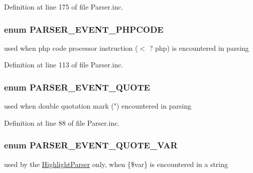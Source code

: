 \-Definition at line 175 of file \-Parser.\-inc.

\hypertarget{_parser_8inc_a120661dfb04934ff4fb7e78e822555c1}{
\subsubsection[{\-P\-A\-R\-S\-E\-R\-\_\-\-E\-V\-E\-N\-T\-\_\-\-P\-H\-P\-C\-O\-D\-E}]{\setlength{\rightskip}{0pt plus 5cm}enum {\bf \-P\-A\-R\-S\-E\-R\-\_\-\-E\-V\-E\-N\-T\-\_\-\-P\-H\-P\-C\-O\-D\-E}}}\label{_parser_8inc_a120661dfb04934ff4fb7e78e822555c1}
used when php code processor instruction ($<$ ? php) is encountered in parsing 

\-Definition at line 113 of file \-Parser.\-inc.

\hypertarget{_parser_8inc_a2b8139c345c6936b01a5fc73804520f3}{
\subsubsection[{\-P\-A\-R\-S\-E\-R\-\_\-\-E\-V\-E\-N\-T\-\_\-\-Q\-U\-O\-T\-E}]{\setlength{\rightskip}{0pt plus 5cm}enum {\bf \-P\-A\-R\-S\-E\-R\-\_\-\-E\-V\-E\-N\-T\-\_\-\-Q\-U\-O\-T\-E}}}\label{_parser_8inc_a2b8139c345c6936b01a5fc73804520f3}
used when double quotation mark (") encountered in parsing 

\-Definition at line 88 of file \-Parser.\-inc.

\hypertarget{_parser_8inc_ab94387562e4f84fe2f5683d5eb0f0313}{
\subsubsection[{\-P\-A\-R\-S\-E\-R\-\_\-\-E\-V\-E\-N\-T\-\_\-\-Q\-U\-O\-T\-E\-\_\-\-V\-A\-R}]{\setlength{\rightskip}{0pt plus 5cm}enum {\bf \-P\-A\-R\-S\-E\-R\-\_\-\-E\-V\-E\-N\-T\-\_\-\-Q\-U\-O\-T\-E\-\_\-\-V\-A\-R}}}\label{_parser_8inc_ab94387562e4f84fe2f5683d5eb0f0313}
used by the \hyperlink{}{\-Highlight\-Parser} only, when \{\$var\} is encountered in a string 

